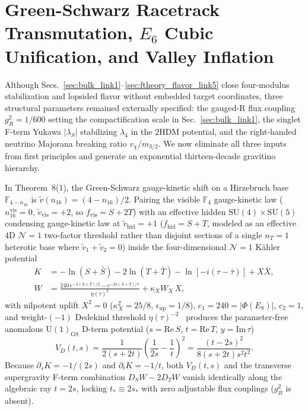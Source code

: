 \documentclass[aps,prd,twocolumn,nofootinbib,floatfix]{revtex4-2}
\begin{document}
\begin{enumerate}
\end{enumerate}

\section{Green-Schwarz Racetrack Transmutation, \texorpdfstring{$E_6$}{E6} Cubic Unification, and Valley Inflation}
\label{sec:hierarchy_link6}

Although Secs.~\ref{sec:bulk_link1}--\ref{sec:ftheory_flavor_link5} close four-modulus stabilization and lopsided flavor without embedded target coordinates, three structural parameters remained externally specified: the gauged-R flux coupling $g_R^2 = 1/600$ setting the compactification scale in Sec.~\ref{sec:bulk_link1}, the singlet F-term Yukawa $|\lambda_S|$ stabilizing $\lambda_4$ in the $2\mathrm{HDM}$ potential, and the right-handed neutrino Majorana breaking ratio $v_\chi / m_{3/2}$.
We now eliminate all three inputs from first principles and generate an exponential thirteen-decade gravitino hierarchy.

In Theorem~8(1), the Green-Schwarz gauge-kinetic shift on a Hirzebruch base $\mathbb{F}_{4-n_{16}}$ is $\tilde{v}(n_{16}) = (4 - n_{16})/2$.
Pairing the visible $\mathbb{F}_4$ gauge-kinetic law ($n_{16}^{\mathrm{vis}} = 0$, $\tilde{v}_{\mathrm{vis}} = +2$, so $f_{\mathrm{vis}} = S + 2T$) with an effective hidden $\mathrm{SU}(4)\times\mathrm{SU}(5)$ condensing gauge-kinetic law at $\tilde{v}_{\mathrm{hid}} = +1$ ($f_{\mathrm{hid}} = S + T$, modeled as an effective 4D $\mathcal{N}=1$ two-factor threshold rather than disjoint sections of a single $n_T = 1$ heterotic base where $\tilde{v}_1 + \tilde{v}_2 = 0$) inside the four-dimensional $\mathcal{N}=1$ K\"ahler potential
\begin{align}
\label{eq:kahler_link6}
K &= -\ln(S+\bar{S}) - 2\ln(T+\bar{T}) - \ln[-i(\tau-\bar{\tau})] + X\bar{X}, \nonumber\\
W &= \frac{240\,e^{-\pi(S+T)/2} - e^{-2\pi(S+T)/5}}{\eta(\tau)^2} + \kappa_X W_X\,X,
\end{align}
with nilpotent uplift $X^2 = 0$ ($\kappa_X^2 = 25/8$, $\epsilon_{\mathrm{up}} = 1/8$), $c_1 = 240 = |\Phi(E_8)|$, $c_2 = 1$, and weight-$(-1)$ Dedekind threshold $\eta(\tau)^{-2}$~\cite{Krasnikov1987,FontIbanezLustQuevedo1990,DixonKaplunovskyLouis1991} produces the parameter-free anomalous $\mathrm{U}(1)_{\mathrm{GS}}$ D-term potential ($s = \mathrm{Re}\,S$, $t = \mathrm{Re}\,T$, $y = \mathrm{Im}\,\tau$)
\begin{equation}
\label{eq:vd_gs_link6}
V_D(t,s) = \frac{1}{2(s+2t)}\left(\frac{1}{2s} - \frac{1}{t}\right)^2 = \frac{(t - 2s)^2}{8(s+2t)s^2 t^2}.
\end{equation}
Because $\partial_s K = -1/(2s)$ and $\partial_t K = -1/t$, both $V_D(t,s)$ and the transverse supergravity F-term combination $D_S W - 2 D_T W$ vanish identically along the algebraic ray $t = 2s$, locking $t_* \equiv 2s_*$ with zero adjustable flux couplings ($g_R^2$ is absent).
\end{document}
